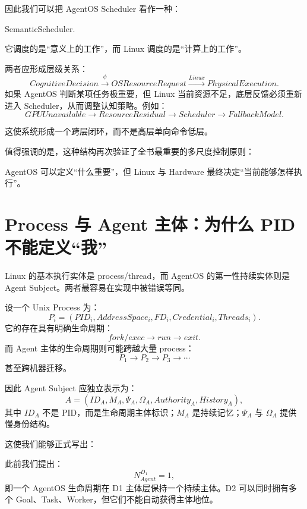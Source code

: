 因此我们可以把 AgentOS Scheduler 看作一种：
\begin{statementbox}
SemanticScheduler.
\end{statementbox}
它调度的是“意义上的工作”，而 Linux 调度的是“计算上的工作”。

两者应形成层级关系：
\[
CognitiveDecision
\xrightarrow{\phi}
OSResourceRequest
\xrightarrow{Linux}
PhysicalExecution.
\]
如果 AgentOS 判断某项任务极重要，但 Linux 当前资源不足，底层反馈必须重新进入 Scheduler，从而调整认知策略。例如：
\[
GPUUnavailable
\rightarrow
ResourceResidual
\rightarrow
Scheduler
\rightarrow
FallbackModel.
\]

这使系统形成一个跨层闭环，而不是高层单向命令低层。

值得强调的是，这种结构再次验证了全书最重要的多尺度控制原则：
\begin{statementbox}
\centering
{}
\end{statementbox}
AgentOS 可以定义“什么重要”，但 Linux 与 Hardware 最终决定“当前能够怎样执行”。

\section{Process 与 Agent 主体：为什么 PID 不能定义“我”}

Linux 的基本执行实体是 process/thread，而 AgentOS 的第一性持续实体则是 Agent Subject。两者最容易在实现中被错误等同。

设一个 Unix Process 为：
\[
P_i=
(
PID_i,
AddressSpace_i,
FD_i,
Credential_i,
Threads_i
).
\]
它的存在具有明确生命周期：
\[
fork/exec
\rightarrow
run
\rightarrow
exit.
\]
而 Agent 主体的生命周期则可能跨越大量 process：
\[
P_1
\rightarrow
P_2
\rightarrow
P_3
\rightarrow\cdots
\]
甚至跨机器迁移。

因此 Agent Subject 应独立表示为：
\[
A=
(
ID_A,
M_A,
\Psi_A,
\Omega_A,
Authority_A,
History_A
),
\]
其中 $ID_A$ 不是 PID，而是生命周期主体标识；$M_A$ 是持续记忆；$\Psi_A$ 与 $\Omega_A$ 提供慢身份结构。

这使我们能够正式写出：
\begin{statementbox}
\centering
{}
\end{statementbox}

此前我们提出：
\[
N^{D_1}_{Agent}=1,
\]
即一个 AgentOS 生命周期在 D1 主体层保持一个持续主体。D2 可以同时拥有多个 Goal、Task、Worker，但它们不能自动获得主体地位。

